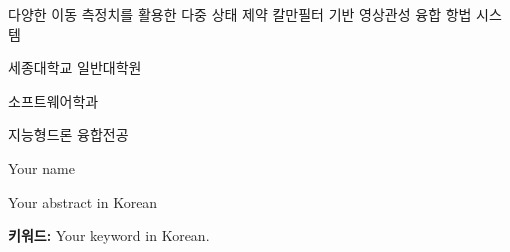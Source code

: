 \documentclass[
11pt, %
english, %
doublespacing, %
liststotoc, %
headsepline, %
]{MastersDoctoralThesis} %
\begin{document}
	
	
	
	
	
	

	
	\appendix %
	
	
	

\begin{krabstract}
	\begin{CJK}{UTF8}{}
		\vspace{1.2cm}
		\begin{center}
			{\fontsize{16}{12}\selectfont 다양한 이동 측정치를 활용한 다중 상태 제약 칼만필터 기반 영상관성 융합 항법 시스템\par}\vspace{1.2cm}
			\begin{flushright}
				{\fontsize{14}{12}\selectfont 세종대학교 일반대학원\par}\vspace{0.6cm} 
				{\fontsize{14}{12}\selectfont 소프트웨어학과\par}\vspace{0.6cm}
				{\fontsize{14}{12}\selectfont 지능형드론 융합전공\par}\vspace{0.6cm}
				{\fontsize{14}{12}\selectfont Your name\par}
			\end{flushright}
		\end{center}
		\vspace{2cm} 
		Your abstract in Korean

		{\bf 키워드:} Your keyword in Korean.
	\end{CJK}	
\end{krabstract}
\end{document}
